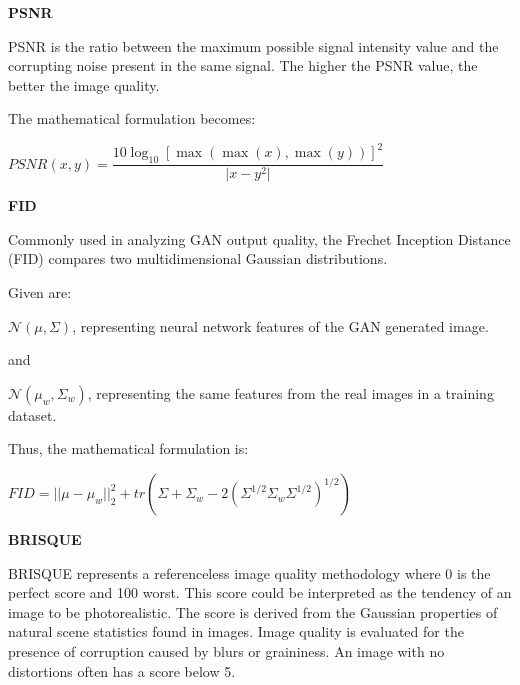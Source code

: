 \vspace{4mm}

\textbf{PSNR}


PSNR is the ratio between the maximum possible signal intensity value and the corrupting noise present in the same signal. 
The higher the PSNR value, the better the image quality. \citep{Metrics}


The mathematical formulation becomes:
\vspace{3mm}

\begin{center}
$PSNR(x,y)=\dfrac{10\log_{10}[\max(\max(x),\max(y))]^2}{\vert{x-y}^2\vert}$
\end{center}


\textbf{FID}


Commonly used in analyzing GAN output quality, the Frechet Inception Distance (FID) compares two multidimensional Gaussian distributions. 

Given are:


$\mathcal{N}(\mu ,\Sigma )$, representing neural network features of the GAN generated image.

and 

$\mathcal{N}(\mu_w,\Sigma_w)$, representing the same features from the real images in a training dataset. 
\citep{FID}

\vspace{3mm}

Thus, the mathematical formulation is:


\begin{center}
$FID=||\mu -\mu _{w}||_{2}^{2} + tr(\Sigma +\Sigma _{w}-2(\Sigma ^{1/2}\Sigma _{w}\Sigma ^{1/2})^{1/2})$
\end{center}

\vspace{5mm}

\textbf{BRISQUE}


BRISQUE represents a referenceless image quality methodology where 0 is the perfect score and 100 worst.
This score could be interpreted as the tendency of an image to be photorealistic. The score is derived from
the Gaussian properties of natural scene statistics found in images.
Image quality is evaluated for the presence of corruption caused by blurs or graininess. 
An image with no distortions often has a score below 5. \citep{BRISQUE}

\vspace{3mm}


